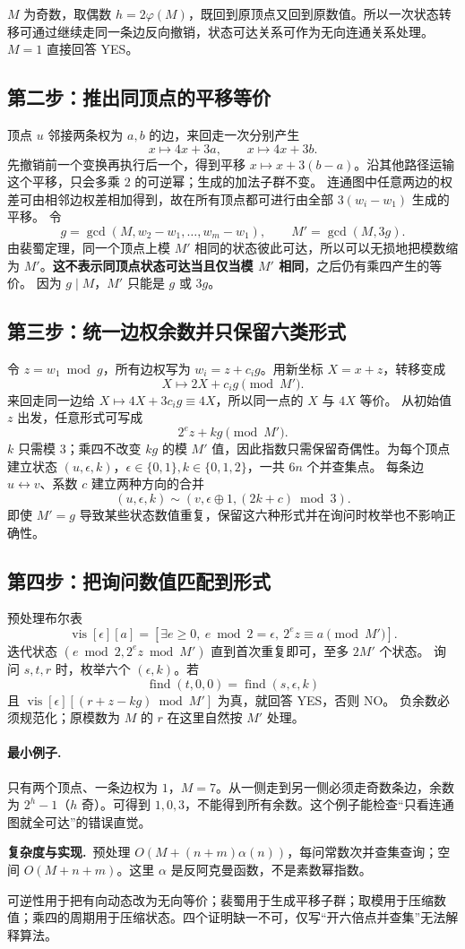 \documentclass[UTF8,a4paper,11pt,oneside,openany,fontset=fandol]{ctexbook}
\theoremstyle{definition}
\newcommand{\cost}{\par\noindent\textbf{复杂度与实现.}\ }
\begin{document}
$M$ 为奇数，取偶数 $h=2\varphi(M)$，既回到原顶点又回到原数值。所以一次状态转移可通过继续走同一条边反向撤销，状态可达关系可作为无向连通关系处理。$M=1$ 直接回答 YES。

\subsection{第二步：推出同顶点的平移等价}
顶点 $u$ 邻接两条权为 $a,b$ 的边，来回走一次分别产生
\[
 x\mapsto4x+3a,\qquad x\mapsto4x+3b.
\]
先撤销前一个变换再执行后一个，得到平移 $x\mapsto x+3(b-a)$。沿其他路径运输这个平移，只会多乘 $2$ 的可逆幂；生成的加法子群不变。
连通图中任意两边的权差可由相邻边权差相加得到，故在所有顶点都可进行由全部 $3(w_i-w_1)$ 生成的平移。
令
\[
 g=\gcd(M,w_2-w_1,\ldots,w_m-w_1),\qquad M'=\gcd(M,3g).
\]
由裴蜀定理，同一个顶点上模 $M'$ 相同的状态彼此可达，所以可以无损地把模数缩为 $M'$。\textbf{这不表示同顶点状态可达当且仅当模 $M'$ 相同}，之后仍有乘四产生的等价。
因为 $g\mid M$，$M'$ 只能是 $g$ 或 $3g$。

\subsection{第三步：统一边权余数并只保留六类形式}
令 $z=w_1\bmod g$，所有边权写为 $w_i=z+c_ig$。用新坐标 $X=x+z$，转移变成
\[
 X\mapsto2X+c_ig\pmod{M'}.
\]
来回走同一边给 $X\mapsto4X+3c_ig\equiv4X$，所以同一点的 $X$ 与 $4X$ 等价。
从初始值 $z$ 出发，任意形式可写成
\[
 2^ez+kg\pmod{M'}.
\]
$k$ 只需模 $3$；乘四不改变 $kg$ 的模 $M'$ 值，因此指数只需保留奇偶性。为每个顶点建立状态 $(u,\epsilon,k)$，$\epsilon\in\{0,1\},k\in\{0,1,2\}$，一共 $6n$ 个并查集点。
每条边 $u\leftrightarrow v$、系数 $c$ 建立两种方向的合并
\[
 (u,\epsilon,k)\sim(v,\epsilon\oplus1,(2k+c)\bmod3).
\]
即使 $M'=g$ 导致某些状态数值重复，保留这六种形式并在询问时枚举也不影响正确性。

\subsection{第四步：把询问数值匹配到形式}
预处理布尔表
\[
 \operatorname{vis}[\epsilon][a]=[\exists e\ge0,\ e\bmod2=\epsilon,\ 2^ez\equiv a\pmod{M'}].
\]
迭代状态 $(e\bmod2,2^ez\bmod M')$ 直到首次重复即可，至多 $2M'$ 个状态。
询问 $s,t,r$ 时，枚举六个 $(\epsilon,k)$。若
\[
\operatorname{find}(t,0,0)=\operatorname{find}(s,\epsilon,k)
\]
且 $\operatorname{vis}[\epsilon][(r+z-kg)\bmod M']$ 为真，就回答 YES，否则 NO。
负余数必须规范化；原模数为 $M$ 的 $r$ 在这里自然按 $M'$ 处理。

\paragraph{最小例子.} 只有两个顶点、一条边权为 $1$，$M=7$。从一侧走到另一侧必须走奇数条边，余数为 $2^h-1$（$h$ 奇）。可得到 $1,0,3$，不能得到所有余数。这个例子能检查“只看连通图就全可达”的错误直觉。
\cost 预处理 $O(M+(n+m)\alpha(n))$，每问常数次并查集查询；空间 $O(M+n+m)$。这里 $\alpha$ 是反阿克曼函数，不是素数幂指数。
\begin{teach}[为何这道题适合作为同余代数的结课题]
可逆性用于把有向动态改为无向等价；裴蜀用于生成平移子群；取模用于压缩数值；乘四的周期用于压缩状态。四个证明缺一不可，仅写“开六倍点并查集”无法解释算法。
\end{teach}
\end{document}
